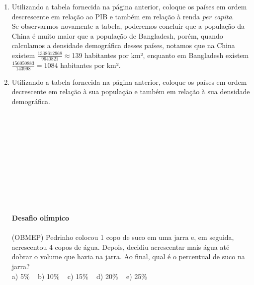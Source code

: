 \documentclass[a4paper,14pt]{article}
\begin{document}
    \begin{multicols}{2}
    	\begin{enumerate}
    		\item Utilizando a tabela fornecida na página anterior, coloque os países em ordem descrescente em relação ao PIB e também em relação à renda \textit{per capita}. \\
    		Se observarmos novamente a tabela, poderemos concluir que a população da China é muito maior que a população de Bangladesh, porém, quando calculamos a densidade demográfica desses países, notamos que na China existem $\frac{1 338 612 968}{9 640 821} \approx $139 habitantes por km², enquanto em Bangladesh existem $\frac{156 050 883}{143 998} = 1 084 $ habitantes por km².
    		\columnbreak
    		\item Utilizando a tabela fornecida na página anterior, coloque os países em ordem decrescente em relação à sua população e também em relação à sua densidade demográfica. \\\\\\\\\\\\\\\\\\\\\\\\
    		\textbf{Desafio olímpico}  \\\\
    		(OBMEP) Pedrinho colocou 1 copo de suco em uma jarra e, em seguida, acrescentou 4 copos de água. Depois, decidiu acrescentar mais água até dobrar o volume que havia na jarra. Ao final, qual é o percentual de suco na jarra? \\
    		a) 5\% ~ b) 10\% ~ c) 15\% ~ d) 20\% ~ e) 25\%
    	\end{enumerate}
    \end{multicols}
\end{document}
